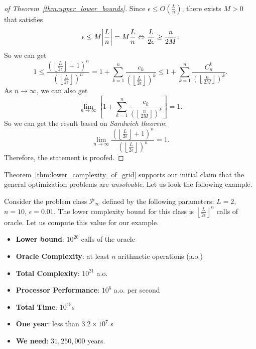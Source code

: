 \begin{proof}[of Theorem~\ref{thm:upper_lower_bounds}]
    Since \(\epsilon \le O\left( \frac{L}{n} \right)\), there exists \(M > 0\) that satisfies
    \[
        \epsilon \le M \abs{\frac{L}{n}} = M \frac{L}{n} \Leftrightarrow \frac{L}{2\epsilon} \ge \frac{n}{2M}.
    \]
    So we can get
    \[
        1 \le \frac{\left(\left\lfloor \frac{L}{2\epsilon} \right\rfloor + 1\right)^n}{\left(\left\lfloor \frac{L}{2\epsilon} \right\rfloor\right)^n} 
        = 1 + \sum_{k=1}^n\frac{c_k}{\left(\left\lfloor \frac{L}{2\epsilon} \right\rfloor\right)^k} 
        \le 1 + \sum_{k=1}^n\frac{C_n^k}{\left(\left\lfloor \frac{n}{2M} \right\rfloor\right)^k}.
    \]
    As \(n \to \infty\), we can also get
    \[
        \lim_{n\to\infty}\left[1 + \sum_{k=1}^n\frac{c_k}{\left(\left\lfloor \frac{n}{2M} \right\rfloor\right)^k}\right] = 1.
    \]
    So we can get the result based on \emph{Sandwich theorem}:
    \[
        \lim_{n \to \infty} \frac{\left(\left\lfloor \frac{L}{2\epsilon} \right\rfloor + 1\right)^n}{\left(\left\lfloor \frac{L}{2\epsilon} \right\rfloor\right)^n} = 1.
    \]
    Therefore, the statement is proofed.
\end{proof}

Theorem~\ref{thm:lower_complexity_of_grid} supports our initial claim that the general optimization problems are \emph{unsolvable}. Let us look the following example.

\begin{example}
    Consider the problem class \(\mathscr{P}_\infty\) defined by the following parameters: \(L = 2\), \(n = 10\), \(\epsilon = 0.01\).
    The lower complexity bound for this class is \(\left\lfloor \frac{L}{2\epsilon} \right\rfloor^n\) calls of oracle. Let us compute this value for our example.
    \begin{itemize}
        \item \textbf{Lower bound}: \(10^{20}\) calls of the oracle
        \item \textbf{Oracle Complexity}: at least \(n\) arithmetic operations (a.o.)
        \item \textbf{Total Complexity}: \(10^{21}\) a.o.
        \item \textbf{Processor Performance}: \(10^6\) a.o. per second
        \item \textbf{Total Time}: \(10^{15}\)s
        \item \textbf{One year}: less than \(3.2\times 10^7\) s
        \item \textbf{We need}: \(31,250,000\) years.
    \end{itemize}
\end{example}

